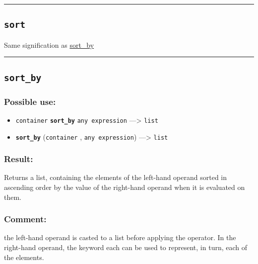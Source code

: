\documentclass[]{book}
\providecommand{\tightlist}{%
  \setlength{\itemsep}{0pt}\setlength{\parskip}{0pt}}
\theoremstyle{definition}
\theoremstyle{definition}
\theoremstyle{definition}
\theoremstyle{remark}
\begin{document}
\begin{center}\rule{0.5\linewidth}{\linethickness}\end{center}

\subsection{\texorpdfstring{\texttt{sort}}{sort}}\label{sort}

Same signification as \href{operators-s-to-z.html\#sort_by}{sort\_by}

\begin{center}\rule{0.5\linewidth}{\linethickness}\end{center}

\subsection{\texorpdfstring{\texttt{sort\_by}}{sort\_by}}\label{sort_by}

\subsubsection{Possible use:}\label{possible-use-486}

\begin{itemize}
\tightlist
\item
  \texttt{container} \textbf{\texttt{sort\_by}} \texttt{any\ expression}
  ---\textgreater{} \texttt{list}
\item
  \textbf{\texttt{sort\_by}} (\texttt{container} ,
  \texttt{any\ expression}) ---\textgreater{} \texttt{list}
\end{itemize}

\subsubsection{Result:}\label{result-470}

Returns a list, containing the elements of the left-hand operand sorted
in ascending order by the value of the right-hand operand when it is
evaluated on them.

\subsubsection{Comment:}\label{comment-89}

the left-hand operand is casted to a list before applying the operator.
In the right-hand operand, the keyword each can be used to represent, in
turn, each of the elements.
\end{document}
